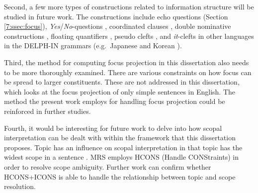

Second, a few more types of constructions related to information
structure will be studied in future work.  The constructions include
echo questions (Section \ref{7:ssec:focus}),
\textit{Yes}/\textit{No}-questions \citep{king:95}, coordinated
clauses \citep{heycock:07}, double nominative constructions
\citep{kim:sells:07,choi:12}, floating quantifiers
\citep{yoshimoto:etal:06,kim:11b}, pseudo clefts \citep{kim:07}, and
\textit{it}-clefts in other languages in the DELPH-IN grammars
(e.g.\ Japanese \citep{hiraiwa:ishihara:02,kizu:05} and Korean
\citep{kim:yang:09}).


Third, the method for computing focus projection in this dissertation
also needs to be more thoroughly examined. There are various
constraints on how focus can be spread to larger constituents. These
are not addressed in this dissertation, which looks at the focus
projection of only simple sentences in English. The method the present
work employs for handling focus projection could be reinforced in
further studies.


Fourth, it would be interesting for future work to delve into how
scopal interpretation can be dealt with within the framework that this
dissertation proposes.  Topic has an influence on scopal
interpretation in that topic has the widest scope in a sentence
\citep{buring:97,portner:yabushita:98,erteschik:07}.  MRS employs
HCONS (Handle CONStraints) in order to resolve scope
ambiguity. Further work can confirm whether HCONS+ICONS is able to
handle the relationship between topic and scope resolution.



